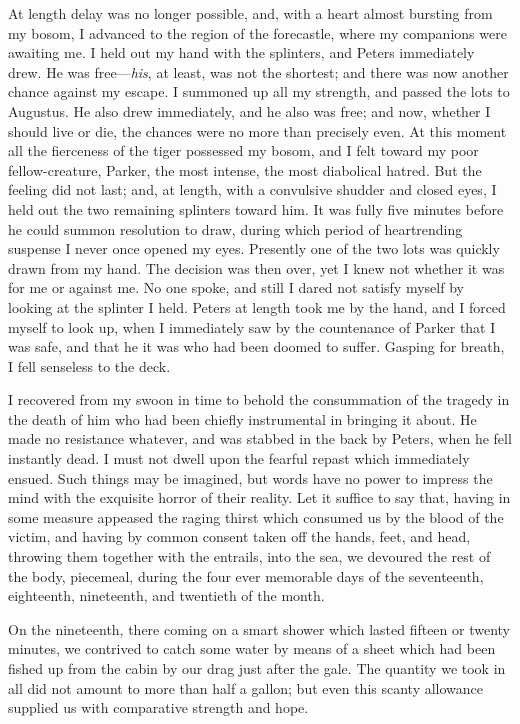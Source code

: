 At length delay was no longer possible, and, with a heart almost bursting
from my bosom, I advanced to the region of the forecastle, where my companions
were awaiting me. I held out my hand with the splinters, and Peters immediately
drew. He was free---\emph{his}, at least, was not the shortest; and there was
now another chance against my escape. I summoned up all my strength, and passed
the lots to Augustus. He also drew immediately, and he also was free; and now,
whether I should live or die, the chances were no more than precisely even. At
this moment all the fierceness of the tiger possessed my bosom, and I felt
toward my poor fellow-creature, Parker, the most intense, the most diabolical
hatred. But the feeling did not last; and, at length, with a convulsive shudder
and closed eyes, I held out the two remaining splinters toward him. It was fully
five minutes before he could summon resolution to draw, during which period of
heartrending suspense I never once opened my eyes. Presently one of the two lots
was quickly drawn from my hand. The decision was then over, yet I knew not
whether it was for me or against me. No one spoke, and still I dared not satisfy
myself by looking at the splinter I held. Peters at length took me by the hand,
and I forced myself to look up, when I immediately saw by the countenance of
Parker that I was safe, and that he it was who had been doomed to suffer.
Gasping for breath, I fell senseless to the deck. 

I recovered from my swoon in time to behold the consummation of the tragedy
in the death of him who had been chiefly instrumental in bringing it about. He
made no resistance whatever, and was stabbed in the back by Peters, when he fell
instantly dead. I must not dwell upon the fearful repast which immediately
ensued. Such things may be imagined, but words have no power to impress the mind
with the exquisite horror of their reality. Let it suffice to say that, having
in some measure appeased the raging thirst which consumed us by the blood of the
victim, and having by common consent taken off the hands, feet, and head,
throwing them together with the entrails, into the sea, we devoured the rest of
the body, piecemeal, during the four ever memorable days of the seventeenth,
eighteenth, nineteenth, and twentieth of the month. 

On the nineteenth, there coming on a smart shower which lasted fifteen or
twenty minutes, we contrived to catch some water by means of a sheet which had
been fished up from the cabin by our drag just after the gale. The quantity we
took in all did not amount to more than half a gallon; but even this scanty
allowance supplied us with comparative strength and hope. 

